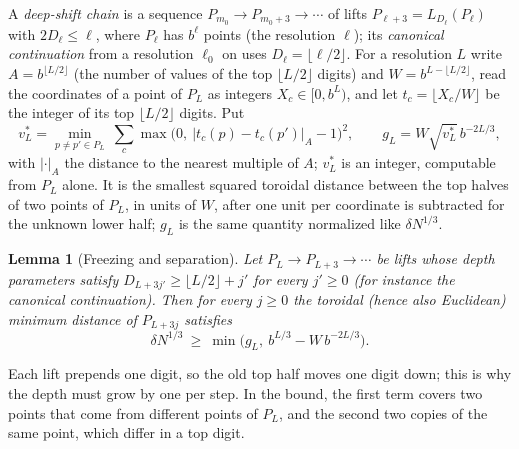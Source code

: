 \documentclass[11pt]{amsart}
\newtheorem{lemma}[theorem]{Lemma}
\theoremstyle{definition}
\theoremstyle{plain}
\begin{document}
A \emph{deep-shift chain} is a sequence $P_{m_0}\to P_{m_0+3}\to\cdots$ of lifts $P_{\ell+3}=L_{D_\ell}(P_\ell)$ with $2D_\ell\le\ell$, where $P_\ell$ has $b^\ell$ points (the resolution $\ell$); its \emph{canonical continuation} from a resolution $\ell_0$ on uses $D_\ell=\lfloor\ell/2\rfloor$. For a resolution $L$ write $A=b^{\lfloor L/2\rfloor}$ (the number of values of the top $\lfloor L/2\rfloor$ digits) and $W=b^{L-\lfloor L/2\rfloor}$, read the coordinates of a point of $P_L$ as integers $X_c\in[0,b^L)$, and let $t_c=\lfloor X_c/W\rfloor$ be the integer of its top $\lfloor L/2\rfloor$ digits. Put
\[
v^*_L=\min_{p\ne p'\in P_L}\ \sum_{c}\max\bigl(0,\ |t_c(p)-t_c(p')|_{A}-1\bigr)^2,\qquad g_L=W\sqrt{v^*_L}\,b^{-2L/3},
\]
with $|\cdot|_A$ the distance to the nearest multiple of $A$; $v^*_L$ is an integer, computable from $P_L$ alone. It is the smallest squared toroidal distance between the top halves of two points of $P_L$, in units of $W$, after one unit per coordinate is subtracted for the unknown lower half; $g_L$ is the same quantity normalized like $\delta N^{1/3}$.

\begin{lemma}[Freezing and separation]\label{lem:liftsep}
Let $P_L\to P_{L+3}\to\cdots$ be lifts whose depth parameters satisfy $D_{L+3j'}\ge\lfloor L/2\rfloor+j'$ for every $j'\ge0$ (for instance the canonical continuation). Then for every $j\ge0$ the toroidal (hence also Euclidean) minimum distance of $P_{L+3j}$ satisfies
\[
\delta N^{1/3}\ \ge\ \min\bigl(g_L,\ b^{L/3}-W\,b^{-2L/3}\bigr).
\]
\end{lemma}

Each lift prepends one digit, so the old top half moves one digit down; this is why the depth must grow by one per step. In the bound, the first term covers two points that come from different points of $P_L$, and the second two copies of the same point, which differ in a top digit.
\end{document}
